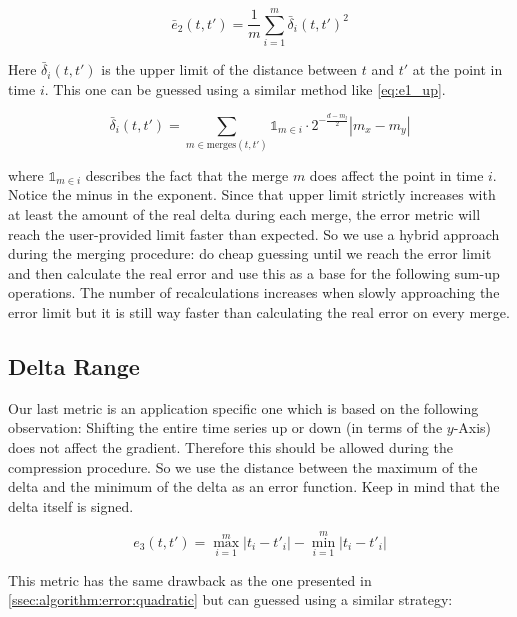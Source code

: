 \begin{equation}\label{eq:e2_up}
    \bar{e}_2\left(t, t'\right) = \frac{1}{m} \sum_{i=1}^m \bar{\delta}_i(t, t')^2
\end{equation}

Here $\bar{\delta}_i(t, t')$ is the upper limit of the distance between $t$ and $t'$ at the point in time $i$. This one can be guessed using a similar method like \autoref{eq:e1_up}.

\begin{equation}\label{eq:delta_up}
    \bar{\delta}_i\left(t, t'\right) = \sum_{m \in \mathrm{merges}(t, t')} \mathbb{1}_{m \in i} \cdot 2^{-\frac{d - m_l}{2}} \left|m_x - m_y\right|
\end{equation}

where $\mathbb{1}_{m \in i}$ describes the fact that the merge $m$ does affect the point in time $i$. Notice the minus in the exponent. Since that upper limit strictly increases with at least the amount of the real delta during each merge, the error metric will reach the user-provided limit faster than expected. So we use a hybrid approach during the merging procedure: do cheap guessing until we reach the error limit and then calculate the real error and use this as a base for the following sum-up operations. The number of recalculations increases when slowly approaching the error limit but it is still way faster than calculating the real error on every merge.


\subsection{Delta Range}
\label{ssec:algorithm:error:range}

Our last metric is an application specific one which is based on the following observation: Shifting the entire time series up or down (in terms of the $y$-Axis) does not affect the gradient. Therefore this should be allowed during the compression procedure. So we use the distance between the maximum of the delta and the minimum of the delta as an error function. Keep in mind that the delta itself is signed.

\begin{equation}\label{eq:e3}
    e_3\left(t, t'\right) = \max_{i=1}^m \left|t_i - t'_i\right| - \min_{i=1}^m \left|t_i - t'_i\right|
\end{equation}

This metric has the same drawback as the one presented in \autoref{ssec:algorithm:error:quadratic} but can guessed using a similar strategy:

